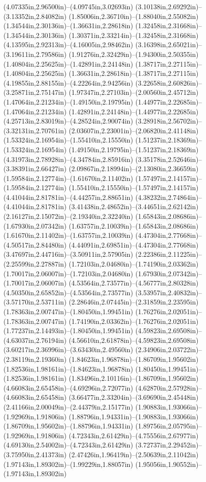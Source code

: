 (4.07335in,2.96500in)--(4.09745in,3.02693in) (3.10138in,2.69292in)--(3.13352in,2.84082in) (1.85006in,2.36710in)--(1.88040in,2.55082in) (1.34544in,2.30136in)--(1.36631in,2.28618in) (1.32458in,2.31668in)--(1.34544in,2.30136in) (1.30371in,2.33214in)--(1.32458in,2.31668in) (4.13595in,2.92313in)--(4.16005in,2.98462in) (3.16398in,2.65021in)--(3.19611in,2.79586in) (1.91276in,2.32429in)--(1.94300in,2.50355in) (1.40804in,2.25625in)--(1.42891in,2.24148in) (1.38717in,2.27115in)--(1.40804in,2.25625in) (1.36631in,2.28618in)--(1.38717in,2.27115in) (4.19855in,2.88155in)--(4.22264in,2.94256in) (3.22658in,2.60826in)--(3.25871in,2.75147in) (1.97347in,2.27103in)--(2.00560in,2.45712in) (1.47064in,2.21234in)--(1.49150in,2.19795in) (1.44977in,2.22685in)--(1.47064in,2.21234in) (1.42891in,2.24148in)--(1.44977in,2.22685in) (4.25713in,2.83019in)--(4.28524in,2.90074in) (3.28918in,2.56702in)--(3.32131in,2.70761in) (2.03607in,2.23001in)--(2.06820in,2.41148in) (1.53324in,2.16954in)--(1.55410in,2.15550in) (1.51237in,2.18369in)--(1.53324in,2.16954in) (1.49150in,2.19795in)--(1.51237in,2.18369in) (4.31973in,2.78928in)--(4.34784in,2.85916in) (3.35178in,2.52646in)--(3.38391in,2.66427in) (2.09867in,2.18994in)--(2.13080in,2.36659in) (1.59584in,2.12774in)--(1.61670in,2.11402in) (1.57497in,2.14157in)--(1.59584in,2.12774in) (1.55410in,2.15550in)--(1.57497in,2.14157in) (4.41044in,2.81781in)--(4.44257in,2.88651in) (4.38232in,2.74864in)--(4.41044in,2.81781in) (3.41438in,2.48652in)--(3.44651in,2.62142in) (2.16127in,2.15072in)--(2.19340in,2.32240in) (1.65843in,2.08686in)--(1.67930in,2.07342in) (1.63757in,2.10039in)--(1.65843in,2.08686in) (1.61670in,2.11402in)--(1.63757in,2.10039in) (4.47304in,2.77668in)--(4.50517in,2.84480in) (4.44091in,2.69851in)--(4.47304in,2.77668in) (3.47697in,2.44716in)--(3.50911in,2.57905in) (2.22386in,2.11225in)--(2.25599in,2.27887in) (1.72103in,2.04680in)--(1.74190in,2.03362in) (1.70017in,2.06007in)--(1.72103in,2.04680in) (1.67930in,2.07342in)--(1.70017in,2.06007in) (4.53564in,2.73577in)--(4.56777in,2.80328in) (4.50350in,2.65852in)--(4.53564in,2.73577in) (3.53957in,2.40832in)--(3.57170in,2.53711in) (2.28646in,2.07445in)--(2.31859in,2.23595in) (1.78363in,2.00747in)--(1.80450in,1.99451in) (1.76276in,2.02051in)--(1.78363in,2.00747in) (1.74190in,2.03362in)--(1.76276in,2.02051in) (1.77237in,2.14493in)--(1.80450in,1.99451in) (4.59823in,2.69508in)--(4.63037in,2.76194in) (4.56610in,2.61878in)--(4.59823in,2.69508in) (3.60217in,2.36996in)--(3.63430in,2.49560in) (2.34906in,2.03722in)--(2.38119in,2.19360in) (1.84623in,1.96878in)--(1.86709in,1.95602in) (1.82536in,1.98161in)--(1.84623in,1.96878in) (1.80450in,1.99451in)--(1.82536in,1.98161in) (1.83496in,2.10116in)--(1.86709in,1.95602in) (4.66083in,2.65458in)--(4.69296in,2.72077in) (4.62870in,2.57928in)--(4.66083in,2.65458in) (3.66477in,2.33204in)--(3.69690in,2.45448in) (2.41166in,2.00049in)--(2.44379in,2.15177in) (1.90883in,1.93066in)--(1.92969in,1.91806in) (1.88796in,1.94331in)--(1.90883in,1.93066in) (1.86709in,1.95602in)--(1.88796in,1.94331in) (1.89756in,2.05795in)--(1.92969in,1.91806in) (4.72343in,2.61429in)--(4.75556in,2.67977in) (4.69130in,2.54002in)--(4.72343in,2.61429in) (3.72737in,2.29452in)--(3.75950in,2.41373in) (2.47426in,1.96419in)--(2.50639in,2.11042in) (1.97143in,1.89302in)--(1.99229in,1.88057in) (1.95056in,1.90552in)--(1.97143in,1.89302in) 